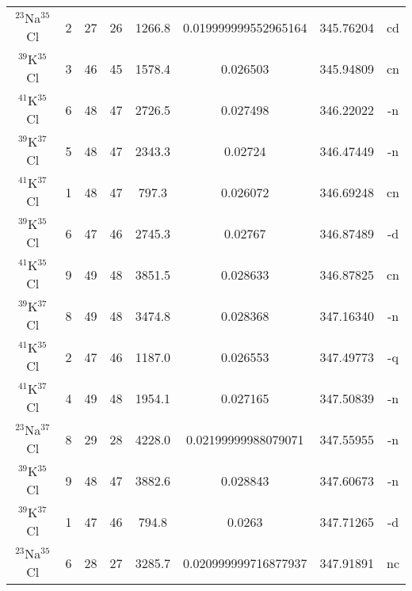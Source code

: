 \begin{table*}[htp]
\begin{tabular}{cccccccc}
$^{23}$Na$^{35}$Cl & 2 & 27 & 26 & 1266.8 & 0.019999999552965164 & 345.76204 & cd \\
$^{39}$K$^{35}$Cl & 3 & 46 & 45 & 1578.4 & 0.026503 & 345.94809 & cn \\
$^{41}$K$^{35}$Cl & 6 & 48 & 47 & 2726.5 & 0.027498 & 346.22022 & -n \\
$^{39}$K$^{37}$Cl & 5 & 48 & 47 & 2343.3 & 0.02724 & 346.47449 & -n \\
$^{41}$K$^{37}$Cl & 1 & 48 & 47 & 797.3 & 0.026072 & 346.69248 & cn \\
$^{39}$K$^{35}$Cl & 6 & 47 & 46 & 2745.3 & 0.02767 & 346.87489 & -d \\
$^{41}$K$^{35}$Cl & 9 & 49 & 48 & 3851.5 & 0.028633 & 346.87825 & cn \\
$^{39}$K$^{37}$Cl & 8 & 49 & 48 & 3474.8 & 0.028368 & 347.16340 & -n \\
$^{41}$K$^{35}$Cl & 2 & 47 & 46 & 1187.0 & 0.026553 & 347.49773 & -q \\
$^{41}$K$^{37}$Cl & 4 & 49 & 48 & 1954.1 & 0.027165 & 347.50839 & -n \\
$^{23}$Na$^{37}$Cl & 8 & 29 & 28 & 4228.0 & 0.02199999988079071 & 347.55955 & -n \\
$^{39}$K$^{35}$Cl & 9 & 48 & 47 & 3882.6 & 0.028843 & 347.60673 & -n \\
$^{39}$K$^{37}$Cl & 1 & 47 & 46 & 794.8 & 0.0263 & 347.71265 & -d \\
$^{23}$Na$^{35}$Cl & 6 & 28 & 27 & 3285.7 & 0.020999999716877937 & 347.91891 & nc \\
\hline
\end{tabular}

\par 
\end{table*}
